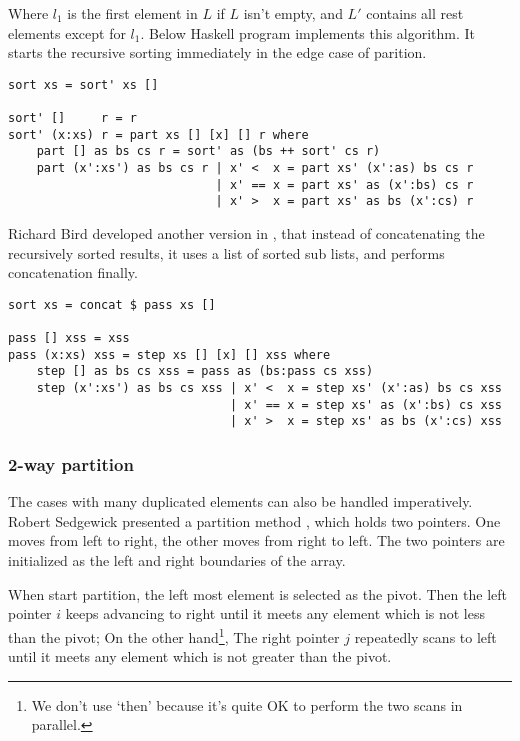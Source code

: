 \documentclass[UTF8]{article}
\begin{document}
Where $l_1$ is the first element in $L$ if $L$ isn't empty, and $L'$ contains all rest elements except for $l_1$.
Below Haskell program implements this algorithm. It starts the recursive sorting immediately in the edge
case of parition.

\lstset{language=Haskell}
\begin{lstlisting}
sort xs = sort' xs []

sort' []     r = r
sort' (x:xs) r = part xs [] [x] [] r where
    part [] as bs cs r = sort' as (bs ++ sort' cs r)
    part (x':xs') as bs cs r | x' <  x = part xs' (x':as) bs cs r
                             | x' == x = part xs' as (x':bs) cs r
                             | x' >  x = part xs' as bs (x':cs) r
\end{lstlisting}

Richard Bird developed another version in \cite{fp-pearls}, that instead of concatenating the
recursively sorted results, it uses a list of sorted sub lists, and performs concatenation
finally.

\lstset{language=Haskell}
\begin{lstlisting}
sort xs = concat $ pass xs []

pass [] xss = xss
pass (x:xs) xss = step xs [] [x] [] xss where
    step [] as bs cs xss = pass as (bs:pass cs xss)
    step (x':xs') as bs cs xss | x' <  x = step xs' (x':as) bs cs xss
                               | x' == x = step xs' as (x':bs) cs xss
                               | x' >  x = step xs' as bs (x':cs) xss
\end{lstlisting} %

\subsubsection{2-way partition}
The cases with many duplicated elements can also be handled imperatively. Robert Sedgewick presented a partition
method \cite{qsort-impl}, \cite{pearls}
which holds two pointers. One moves from left to right, the other moves from right to left. The two pointers
are initialized as the left and right boundaries of the array.

When start partition, the left most element is selected as the pivot. Then the left pointer $i$
keeps advancing to right until it meets any element which is not less than the pivot; On the other hand\footnote{We don't use `then' because it's quite OK to perform the two scans in parallel.}, The right pointer $j$ repeatedly scans to
left until it meets any element which is not greater than the pivot.
\end{document}
